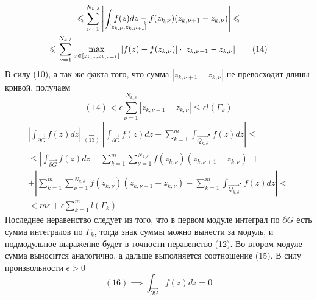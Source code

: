 \documentclass[main]{subfiles}
\begin{document}
\begin{longProof}
\begin{multline*}
        \le \sum_{\nu = 1}^{N_{k, \delta}} \left| \int_{\mathrlap{\overrightarrow{[z_{k, \nu}, z_{k, \nu + 1}]}}}\  f(z) dz -  f(z_{k, \nu}) (z_{k, \nu + 1} - z_{k, \nu}) \right| \le \\
        \le \sum_{\nu = 1}^{N_{k, \delta}} \max_{z \in [z_{k, \nu}, z_{k, \nu + 1}]} |f(z) - f(z_{k, \nu})| \cdot |z_{k, \nu + 1} - z_{k, \nu}| \tag{14}
    \end{multline*}
    В силу (10), а так же факта того, что сумма $|z_{k, \nu + 1} - z_{k, \nu}|$ не превосходит длины кривой, получаем 
    \[(14) < \epsilon \sum_{\nu = 1}^{N_{k, \delta}} |z_{k, \nu + 1} - z_{k, \nu}| \le \epsilon l(\Gamma_k) \tag{15}\]
    \begin{multline*}
        \left| \int_{\overrightarrow{\partial G}} f(z) dz \right| \underset{(13)}{=}
        \left| \int_{\overrightarrow{\partial G}} f(z) dz  - \sum_{k=1}^{m} \int_{\overrightarrow{Q_{k, \delta}}^\bullet} f(z) dz  \right| \le \\
        \le \left| \int_{\overrightarrow{\partial G}} f(z) dz  - \sum_{k=1}^{m} \sum_{\nu = 1}^{N_{k, \delta}} f(z_{k,\nu}) (z_{k, \nu + 1} - z_{k, \nu})\right| +\\
        + \left| \sum_{k=1}^{m} \sum_{\nu = 1}^{N_{k, \delta}} f(z_{k,\nu}) (z_{k, \nu + 1} - z_{k, \nu}) - \sum_{k=1}^{m} \int_{\overrightarrow{Q_{k, \delta}}^\bullet} f(z) dz \right| < \\
        < m \epsilon + \epsilon \sum_{k=1}^{m} l(\Gamma_k) \tag{16}
    \end{multline*}
    Последнее неравенство следует из того, что в первом модуле интеграл по $\partial G$ есть сумма интегралов по $\Gamma_k$, тогда знак суммы можно вынести за модуль, и подмодульное выражение будет в точности неравенство (12).
    Во втором модуле сумма выносится аналогично, а дальше выполняется соотношение (15).
    В силу произвольности $\epsilon > 0$
    \[(16) \implies \int_{\overrightarrow{\partial G}} f(z) dz = 0\]
\end{longProof}
\end{document}
